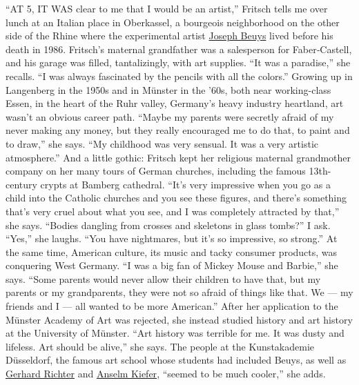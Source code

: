 ``AT 5, IT WAS clear to me that I would be an artist,'' Fritsch tells me
over lunch at an Italian place in Oberkassel, a bourgeois neighborhood
on the other side of the Rhine where the experimental artist
\href{https://www.nytimes3xbfgragh.onion/1986/01/25/obituaries/joseph-beuys-sculptor-is-dead-at-64.html}{Joseph
Beuys} lived before his death in 1986. Fritsch's maternal grandfather
was a salesperson for Faber‑Castell, and his garage was filled,
tantalizingly, with art supplies. ``It was a paradise,'' she recalls.
``I was always fascinated by the pencils with all the colors.'' Growing
up in Langenberg in the 1950s and in Münster in the '60s, both near
working-class Essen, in the heart of the Ruhr valley, Germany's heavy
industry heartland, art wasn't an obvious career path. ``Maybe my
parents were secretly afraid of my never making any money, but they
really encouraged me to do that, to paint and to draw,'' she says. ``My
childhood was very sensual. It was a very artistic atmosphere.'' And a
little gothic: Fritsch kept her religious maternal grandmother company
on her many tours of German churches, including the famous 13th-century
crypts at Bamberg cathedral. ``It's very impressive when you go as a
child into the Catholic churches and you see these figures, and there's
something that's very cruel about what you see, and I was completely
attracted by that,'' she says. ``Bodies dangling from crosses and
skeletons in glass tombs?'' I ask. ``Yes,'' she laughs. ``You have
nightmares, but it's so impressive, so strong.'' At the same time,
American culture, its music and tacky consumer products, was conquering
West Germany. ``I was a big fan of Mickey Mouse and Barbie,'' she says.
``Some parents would never allow their children to have that, but my
parents or my grandparents, they were not so afraid of things like that.
We --- my friends and I --- all wanted to be more American.'' After her
application to the Münster Academy of Art was rejected, she instead
studied history and art history at the University of Münster. ``Art
history was terrible for me. It was dusty and lifeless. Art should be
alive,'' she says. The people at the Kunstakademie Düsseldorf, the
famous art school whose students had included Beuys, as well as
\href{https://www.nytimes3xbfgragh.onion/2011/10/29/arts/29iht-melikian29.html}{Gerhard
Richter} and
\href{https://tmagazine.blogs.nytimes3xbfgragh.onion/2013/05/03/artifacts-the-dinosaur-in-anselm-kiefer/}{Anselm
Kiefer}, ``seemed to be much cooler,'' she adds.

